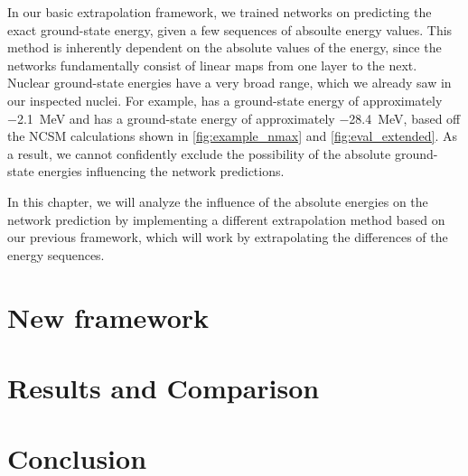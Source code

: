 In our basic extrapolation framework, we trained networks on predicting the exact ground-state energy, given a few sequences of absoulte energy values. This method is inherently dependent on the absolute values of the energy, since the networks fundamentally consist of linear maps from one layer to the next. Nuclear ground-state energies have a very broad range, which we already saw in our inspected nuclei. For example,  has a ground-state energy of approximately \SI{-2.1}{\mega\electronvolt} and  has a ground-state energy of approximately \SI{-28.4}{\mega\electronvolt}, based off the NCSM calculations shown in \autoref{fig:example_nmax} and \autoref{fig:eval_extended}. As a result, we cannot confidently exclude the possibility of the absolute ground-state energies influencing the network predictions.

In this chapter, we will analyze the influence of the absolute energies on the network prediction by implementing a different extrapolation method based on our previous framework, which will work by extrapolating the differences of the energy sequences.
\section{New framework}

\section{Results and Comparison}

\section{Conclusion}

